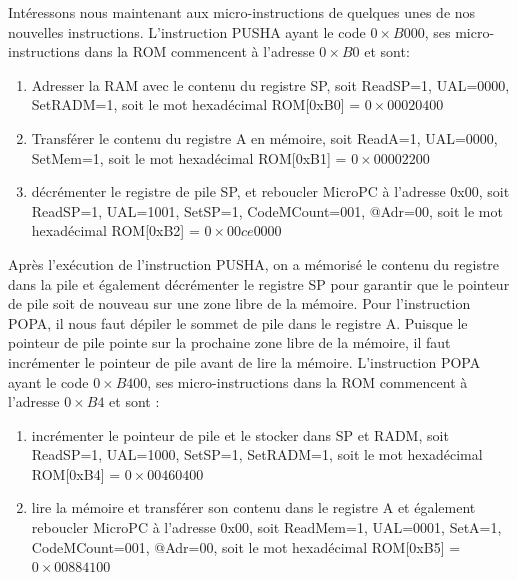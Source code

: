 Intéressons nous maintenant aux micro-instructions de quelques unes de nos nouvelles instructions. L'instruction PUSHA ayant le code $0\times B000$, ses micro-instructions dans la ROM commencent à l'adresse $0\times B0$ et sont:
\begin{enumerate}
\item Adresser la RAM avec le contenu du registre SP, soit ReadSP=1, UAL=0000, SetRADM=1, soit le mot hexadécimal ROM[0xB0] = $0\times00020400$
\item Transférer le contenu du registre A en mémoire, soit ReadA=1, UAL=0000, SetMem=1, soit le mot hexadécimal ROM[0xB1] = $0\times00002200$
\item décrémenter le registre de pile SP, et reboucler MicroPC à l'adresse 0x00, soit ReadSP=1, UAL=1001, SetSP=1, CodeMCount=001, @Adr=00, soit le mot hexadécimal ROM[0xB2] = $0\times00ce0000$
\end{enumerate}
Après l'exécution de l'instruction PUSHA, on a mémorisé le contenu du registre dans la pile et également décrémenter le registre SP pour garantir que le pointeur de pile soit de nouveau sur une zone libre de la mémoire. Pour l'instruction POPA, il nous faut dépiler le sommet de pile dans le registre A. Puisque le pointeur de pile pointe sur la prochaine zone libre de la mémoire, il faut incrémenter le pointeur de pile avant de lire la mémoire. L'instruction POPA ayant le code $0\times B400$, ses micro-instructions dans la ROM commencent à l'adresse $0\times B4$ et sont :
\begin{enumerate}
\item incrémenter le pointeur de pile et le stocker dans SP et RADM, soit ReadSP=1, UAL=1000, SetSP=1, SetRADM=1, soit le mot hexadécimal ROM[0xB4] = $0\times00460400$
\item lire la mémoire et transférer son contenu dans le registre A et également reboucler MicroPC à l'adresse 0x00, soit ReadMem=1, UAL=0001, SetA=1, CodeMCount=001, @Adr=00, soit le mot hexadécimal ROM[0xB5] = $0\times00884100$
\end{enumerate}

